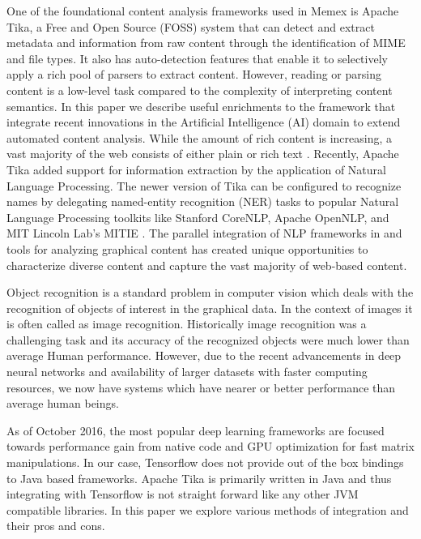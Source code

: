 One of the foundational content analysis frameworks used in Memex is Apache Tika\cite{mattmann2011tika}, a Free and Open Source (FOSS) system that can detect and extract metadata and information from raw content through the identification of MIME and file types. It also has auto-detection features that enable it to selectively apply a rich pool of parsers to extract content. However, reading or parsing content is a low-level task compared to the complexity of interpreting content semantics. In this paper we describe useful enrichments to the framework that integrate recent innovations in the Artificial Intelligence (AI) domain to extend automated content analysis. While the amount of rich content is increasing, a vast majority of the web consists of either plain or rich text \cite{mphillips-EOT2012}. Recently, Apache Tika added support for information extraction by the application of Natural Language Processing\cite{TikaAndNER}. The newer version of Tika can be configured to recognize names by delegating named-entity recognition (NER) tasks to popular Natural Language Processing toolkits like Stanford CoreNLP\cite{Finkel:2005:INI:1219840.1219885}, Apache OpenNLP\cite{ApacheOpenNLP}, and MIT Lincoln Lab's MITIE \cite{MITIE-github}. The parallel integration of NLP frameworks in and tools for analyzing graphical content has created unique opportunities to characterize diverse content and capture the vast majority of web-based content.

Object recognition is a standard problem in computer vision which deals with the recognition of objects of interest in the graphical data. In the context of images it is often called as image recognition. Historically image recognition was a challenging task and its accuracy of the recognized objects were much lower than average Human performance. However, due to the recent advancements in deep neural networks and availability of larger datasets with faster computing resources, we now have systems which have nearer or better performance than average human beings\cite{karpathy-cnn-compare}.



As of October 2016, the most popular deep learning frameworks are focused towards performance gain from native code and GPU optimization for fast matrix manipulations. In our case, Tensorflow does not provide out of the box bindings to Java based frameworks. Apache Tika is primarily written in Java and thus integrating with Tensorflow is not straight forward like any other JVM compatible libraries. In this paper we explore various methods of integration and their pros and cons.

